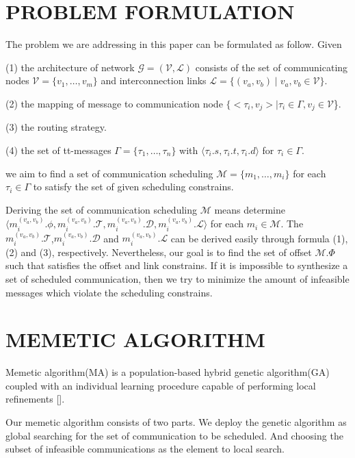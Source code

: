 \documentclass[conference]{IEEEtran}
\begin{document}
\section{PROBLEM FORMULATION}
The problem we are addressing in this paper can be formulated as follow. Given 

(1) the architecture of  network $\mathcal{G}=(\mathcal{V},\mathcal{L})$ consists of the set of communicating nodes $\mathcal{V}=\{\mathit{v}_{1},\dots,\mathit{v}_{m}\}$ and interconnection links $\mathcal{L}=\{ (v_{a},v_{b}) \mid  v_{a},v_{b}\in \mathcal{V}\}$.

(2) the mapping of message to communication node $\{<\tau_{i},v_{j}>\mid \tau_{i}\in\Gamma,v_{j}\in\mathcal{V}$\}. 

(3) the routing strategy.

(4) the set of tt-messages $ \Gamma = \{\tau_{1},\dots,\tau_{n} \}$ with  $\langle \tau_{i}.s, \tau_{i}.t, \tau_{i}.d\rangle$ for $\tau_{i}\in \Gamma$.

we aim to find a set of communication scheduling $\mathcal{M} = \{m_{1},\dots,m_{i}\}$ for each $\tau_{i}\in \Gamma $ to satisfy the set of given scheduling constrains. 

Deriving the set of communication scheduling $\mathcal{M}$ means determine $\langle m_{i}^{(v_{a},v_{b})}.\phi, m_{i}^{(v_{a},v_{b})}.\mathcal{T}, m_{i}^{(v_{a},v_{b})}.\mathcal{D},m_{i}^{(v_{a},v_{b})}.\mathcal{L} \rangle$ for each $m_{i}\in \mathcal{M}$. The $m_{i}^{(v_{a},v_{b})}.\mathcal{T}$,$m_{i}^{(v_{a},v_{b})}.\mathcal{D}$ and $m_{i}^{(v_{a},v_{b})}.\mathcal{L}$ can be derived easily through formula (1),(2) and (3), respectively. Nevertheless, our goal is to find the set of offset $\mathcal{M}.\Phi$ such that satisfies the offset and link constrains. If it is impossible to synthesize a set of scheduled communication, then we try to minimize the amount of infeasible messages which violate the scheduling constrains.

\section{MEMETIC ALGORITHM}

Memetic algorithm(MA) is a population-based hybrid genetic algorithm(GA) coupled with an individual learning procedure capable of performing local refinements []. 

Our memetic algorithm consists of two parts. We deploy the genetic algorithm as global searching for the set of communication to be scheduled. And choosing the subset of infeasible communications as the element to local search.
\end{document}
